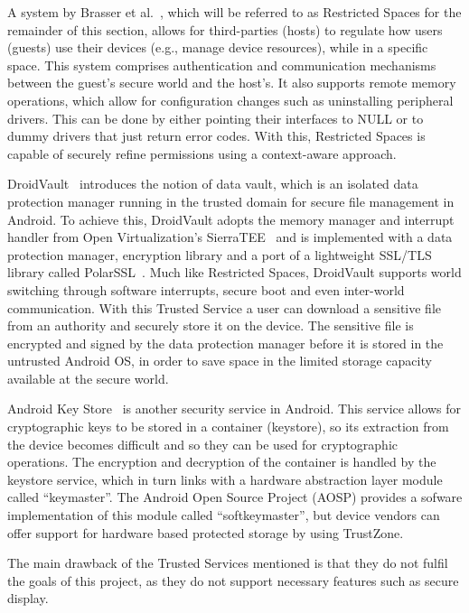 A system by Brasser et al.~\cite{brasserregulating}, which will be referred to as Restricted Spaces for the remainder of this section, allows for third-parties (hosts) to regulate how users (guests) use their devices (e.g., manage device resources), while in a specific space. This system comprises authentication and communication mechanisms between the guest's secure world and the host's. It also supports remote memory operations, which allow for configuration changes such as uninstalling peripheral drivers. This can be done by either pointing their interfaces to NULL or to dummy drivers that just return error codes. With this, Restricted Spaces is capable of securely refine permissions using a context-aware approach.

DroidVault~\cite{li2014droidvault} introduces the notion of data vault, which is an isolated data protection manager running in the trusted domain for secure file management in Android. To achieve this, DroidVault adopts the memory manager and interrupt handler from Open Virtualization's SierraTEE~\cite{sierra_tee} and is implemented with a data protection manager, encryption library and a port of a lightweight SSL/TLS library called PolarSSL~\cite{polar}. Much like Restricted Spaces, DroidVault supports world switching through software interrupts, secure boot and even inter-world communication. With this Trusted Service a user can download a sensitive file from an authority and securely store it on the device. The sensitive file is encrypted and signed by the data protection manager before it is stored in the untrusted Android OS, in order to save space in the limited storage capacity available at the secure world.

Android Key Store~\cite{aks} is another security service in Android. This service allows for cryptographic keys to be stored in a container (keystore), so its extraction from the device becomes difficult and so they can be used for cryptographic operations. The encryption and decryption of the container is handled by the keystore service, which in turn links with a hardware abstraction layer module called ``keymaster''. The Android Open Source Project (AOSP) provides a sofware implementation of this module called ``softkeymaster'', but device vendors can offer support for hardware based protected storage by using TrustZone.

The main drawback of the Trusted Services mentioned is that they do not fulfil the goals of this project, as they do not support necessary features such as secure display. %

